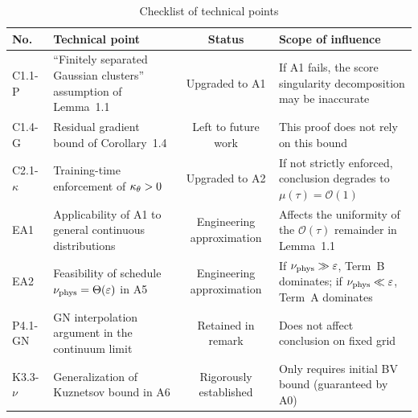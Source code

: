 \begin{table}[h]
\centering
\caption{Checklist of technical points}
\small
\begin{tabular}{llcl}
\toprule
No. & Technical point & Status & Scope of influence \\
\midrule
C1.1-P & ``Finitely separated Gaussian clusters'' assumption of Lemma~1.1 & Upgraded to A1 & If A1 fails, the score singularity decomposition may be inaccurate \\
C1.4-G & Residual gradient bound of Corollary~1.4 & Left to future work & This proof does not rely on this bound \\
C2.1-$\kappa$ & Training-time enforcement of $\kappa_{\theta} > 0$ & Upgraded to A2 & If not strictly enforced, conclusion degrades to $\mu(\tau) = \mathcal{O}(1)$ \\
EA1 & Applicability of A1 to general continuous distributions & Engineering approximation & Affects the uniformity of the $\mathcal{O}(\tau)$ remainder in Lemma~1.1 \\
EA2 & Feasibility of schedule $\nu_{\mathrm{phys}} = \Theta(\varepsilon)$ in A5 & Engineering approximation & If $\nu_{\mathrm{phys}} \gg \varepsilon$, Term~B dominates; if $\nu_{\mathrm{phys}} \ll \varepsilon$, Term~A dominates \\
P4.1-GN & GN interpolation argument in the continuum limit & Retained in remark & Does not affect conclusion on fixed grid \\
K3.3-$\nu$ & Generalization of Kuznetsov bound in A6 & Rigorously established & Only requires initial BV bound (guaranteed by A0) \\
\bottomrule
\end{tabular}
\end{table}